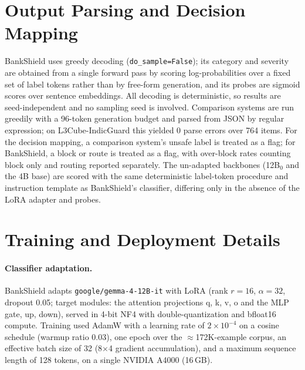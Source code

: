 \documentclass[11pt]{article}
\begin{document}
\section{Output Parsing and Decision Mapping}
\label{app:parsing}

BankShield uses greedy decoding (\texttt{do\_sample=False}); its category and severity are obtained from a single forward pass by scoring log-probabilities over a fixed set of label tokens rather than by free-form generation, and its probes are sigmoid scores over sentence embeddings. All decoding is deterministic, so results are seed-independent and no sampling seed is involved. Comparison systems are run greedily with a 96-token generation budget and parsed from JSON by regular expression; on L3Cube-IndicGuard this yielded 0 parse errors over 764 items. For the decision mapping, a comparison system's unsafe label is treated as a flag; for BankShield, a block or route is treated as a flag, with over-block rates counting block only and routing reported separately.
The un-adapted backbones (12B$_0$ and the 4B base) are scored with the same deterministic
label-token procedure and instruction template as BankShield's classifier, differing only
in the absence of the LoRA adapter and probes.

\section{Training and Deployment Details}
\label{app:training}

\paragraph{Classifier adaptation.} BankShield adapts \texttt{google/gemma-4-12B-it} with LoRA (rank $r{=}16$, $\alpha{=}32$, dropout 0.05; target modules: the attention projections q, k, v, o and the MLP gate, up, down), served in 4-bit NF4 with double-quantization and bfloat16 compute.
Training used AdamW with a learning rate of $2{\times}10^{-4}$ on a cosine schedule (warmup ratio 0.03), one epoch over the $\approx$172K-example corpus, an effective batch size of 32 (8$\times$4 gradient accumulation), and a maximum sequence length of 128 tokens, on a single NVIDIA A4000 (16\,GB).
\end{document}
